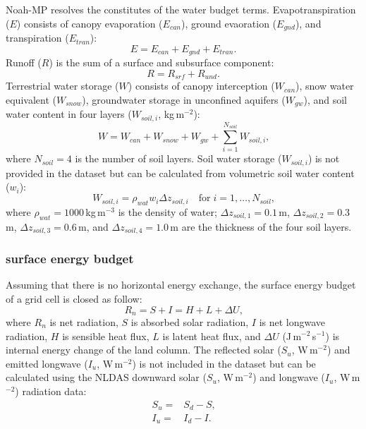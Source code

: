 \documentclass[essd]{copernicus}
\begin{document}
Noah-MP resolves the constitutes of the water budget terms. Evapotranspiration
(\(E\)) consists of canopy evaporation (\(E_{can}\)), ground evaoration
(\(E_{gnd}\)), and transpiration (\(E_{tran}\)):
\begin{equation}
    E = E_{can} + E_{gnd} + E_{tran} \text{.}
\end{equation}
Runoff (\(R\)) is the sum of a surface and subsurface component:
\begin{equation}
    R = R_{srf} + R_{und} \text{.}
\end{equation}
Terrestrial water storage (\(W\)) consists of canopy interception (\(W_{can}\)),
snow water equivalent (\(W_{snow}\)), groundwater storage in unconfined aquifers
(\(W_{gw}\)), and soil water content in four layers (\(W_{soil,i}\),
kg\,m$^{-2}$):
\begin{equation}
    W = W_{can} + W_{snow} + W_{gw} + \sum_{i=1}^{N_{soil}} W_{soil,i} \text{,}
\end{equation}
where \(N_{soil} = 4\) is the number of soil layers.  Soil water storage
(\(W_{soil,i}\)) is not provided in the dataset but can be calculated from
volumetric soil water content (\(w_{i}\)):
\begin{equation}
    W_{soil,i} = \rho_{wat} w_i \Delta z_{soil,i}
    \quad \text{for} \; i = 1,\dots,N_{soil}
    \text{,} \label{eq:soil-vmc}
\end{equation}
where \(\rho_{wat}=1000\)\,kg\,m$^{-3}$ is the density of water; \(\Delta
z_{soil,1}=0.1\)\,m, \(\Delta z_{soil,2}=0.3\)\,m, \(\Delta z_{soil,3}=0.6\)\,m,
and \(\Delta z_{soil,4}=1.0\)\,m are the thickness of the four soil layers.

\subsubsection{surface energy budget}

Assuming that there is no horizontal energy exchange, the surface energy budget
of a grid cell is closed as follow:
\begin{equation}
    R_n = S + I = H + L + \Delta U \text{,} \label{eq:energy-balance}
\end{equation}
where \(R_n\) is net radiation, \(S\) is absorbed solar radiation, \(I\) is net
longwave radiation, \(H\) is sensible heat flux, \(L\) is latent heat flux, and
\(\Delta U\) (J\,m$^{-2}$\,s$^{-1}$) is internal energy change of the land
column. The reflected solar (\(S_u\), W\,m$^{-2}$) and emitted longwave
(\(I_u\), W\,m$^{-2}$) is not included in the dataset but can be calculated
using the NLDAS downward solar (\(S_u\), W\,m$^{-2}$) and longwave
(\(I_u\), W\,m$^{-2}$) radiation data:
\begin{align}
    S_u = & S_d - S \text{,} \\
    I_u = & I_d - I \text{.}
\end{align}
\end{document}
